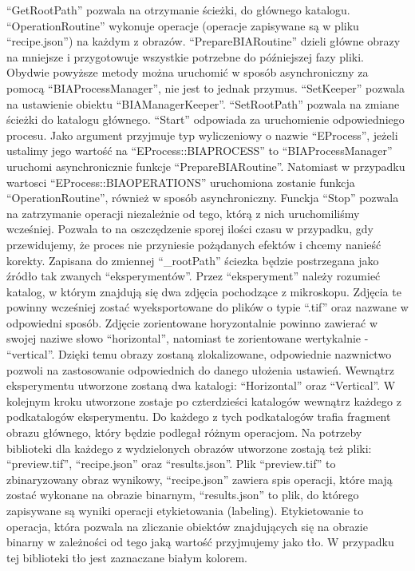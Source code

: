 \documentclass{article}
\begin{document}
{            ``GetRootPath'' pozwala na otrzymanie ścieżki, do głównego katalogu.
            ``OperationRoutine'' wykonuje operacje (operacje zapisywane są w pliku 
            ``recipe.json'') na każdym z obrazów.
            ``PrepareBIARoutine'' dzieli główne obrazy na mniejsze i przygotowuje wszystkie potrzebne do późniejszej fazy pliki.
            Obydwie powyższe metody można uruchomić w sposób asynchroniczny za pomocą ``BIAProcessManager'', nie jest to jednak przymus.
            ``SetKeeper'' pozwala na ustawienie obiektu ``BIAManagerKeeper''.
            ``SetRootPath'' pozwala na zmiane ścieżki do katalogu głównego.
            ``Start'' odpowiada za uruchomienie odpowiedniego procesu. Jako argument przyjmuje typ wyliczeniowy o nazwie ``EProcess'', jeżeli ustalimy jego wartość na ``EProcess::BIAPROCESS'' to ``BIAProcessManager'' uruchomi asynchronicznie funkcje ``PrepareBIARoutine''. Natomiast w przypadku wartosci ``EProcess::BIAOPERATIONS'' uruchomiona zostanie funkcja ``OperationRoutine'', również w sposób asynchroniczny.
            Funckja ``Stop'' pozwala na zatrzymanie operacji niezależnie od tego, którą z nich uruchomiliśmy wcześniej.
            Pozwala to na oszczędzenie sporej ilości czasu w przypadku, gdy przewidujemy, że proces nie przyniesie pożądanych efektów i chcemy nanieść korekty.
            Zapisana do zmiennej ``\_rootPath'' ściezka będzie postrzegana jako źródło tak zwanych ``eksperymentów''.
            Przez ``eksperyment'' należy rozumieć katalog, w którym znajdują się dwa zdjęcia pochodzące z mikroskopu.
            Zdjęcia te powinny wcześniej zostać wyeksportowane do plików o typie ``.tif'' oraz nazwane w odpowiedni sposób.
            Zdjęcie zorientowane horyzontalnie powinno zawierać w swojej naziwe słowo ``horizontal'', natomiast te zorientowane wertykalnie - ``vertical''.
            Dzięki temu obrazy zostaną zlokalizowane, odpowiednie nazwnictwo pozwoli na zastosowanie odpowiednich do danego ułożenia ustawień.
            Wewnątrz eksperymentu utworzone zostaną dwa katalogi: ``Horizontal'' oraz ``Vertical''.
            W kolejnym kroku utworzone zostaje po czterdzieści katalogów wewnątrz każdego z podkatalogów eksperymentu.
            Do każdego z tych podkatalogów trafia fragment obrazu głównego, który będzie podlegał różnym operacjom.
            Na potrzeby biblioteki dla każdego z wydzielonych obrazów utworzone zostają też pliki: ``preview.tif'', ``recipe.json'' oraz ``results.json''.
            Plik ``preview.tif'' to zbinaryzowany obraz wynikowy, ``recipe.json'' zawiera spis operacji, które mają zostać wykonane na obrazie binarnym, ``results.json'' to plik, do którego zapisywane są wyniki operacji etykietowania (labeling).
            Etykietowanie to operacja, która pozwala na zliczanie obiektów znajdujących się na obrazie binarny w zależności od tego jaką wartość przyjmujemy jako tło. W przypadku tej biblioteki tło jest zaznaczane białym kolorem.
        }
\end{document}
